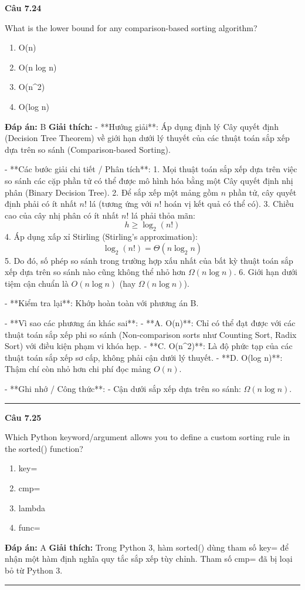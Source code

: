 \documentclass[11pt,a4paper]{article}
\newenvironment{question}[1]{%
  \par\vspace{1em}\noindent\textbf{\large Câu #1}\par\vspace{0.4em}
}{%
  \par\vspace{1em}\hrule\vspace{0.6em}
}
\newenvironment{choices}{%
  \begin{enumerate}[label=\textbf{\Alph*.},leftmargin=2.2em,itemsep=2pt,topsep=3pt]
}{%
  \end{enumerate}
}
\newcommand{\choice}{\item}
\begin{document}
\begin{question}{7.24}
What is the lower bound for any comparison-based sorting algorithm?
\begin{choices}
\choice O(n)
\choice O(n log n)
\choice O(n^2)
\choice O(log n)
\end{choices}
\textbf{Đáp án:} B
\textbf{Giải thích:} - **Hướng giải**:
  Áp dụng định lý Cây quyết định (Decision Tree Theorem) về giới hạn dưới lý thuyết của các thuật toán sắp xếp dựa trên so sánh (Comparison-based Sorting).

- **Các bước giải chi tiết / Phân tích**:
  1. Mọi thuật toán sắp xếp dựa trên việc so sánh các cặp phần tử có thể được mô hình hóa bằng một Cây quyết định nhị phân (Binary Decision Tree).
  2. Để sắp xếp một mảng gồm \(n\) phần tử, cây quyết định phải có ít nhất \(n!\) lá (tương ứng với \(n!\) hoán vị kết quả có thể có).
  3. Chiều cao của cây nhị phân có ít nhất \(n!\) lá phải thỏa mãn:
     \[ h \ge \log_2(n!) \]
  4. Áp dụng xấp xỉ Stirling (Stirling's approximation):
     \[ \log_2(n!) = \Theta(n \log_2 n) \]
  5. Do đó, số phép so sánh trong trường hợp xấu nhất của bất kỳ thuật toán sắp xếp dựa trên so sánh nào cũng không thể nhỏ hơn \(\Omega(n \log n)\).
  6. Giới hạn dưới tiệm cận chuẩn là \(O(n \log n)\) (hay \(\Omega(n \log n)\)).

- **Kiểm tra lại**:
  Khớp hoàn toàn với phương án B.

- **Vì sao các phương án khác sai**:
  - **A. O(n)**: Chỉ có thể đạt được với các thuật toán sắp xếp phi so sánh (Non-comparison sorts như Counting Sort, Radix Sort) với điều kiện phạm vi khóa hẹp.
  - **C. O(n^2)**: Là độ phức tạp của các thuật toán sắp xếp sơ cấp, không phải cận dưới lý thuyết.
  - **D. O(log n)**: Thậm chí còn nhỏ hơn chi phí đọc mảng \(O(n)\).

- **Ghi nhớ / Công thức**:
  - Cận dưới sắp xếp dựa trên so sánh: \(\Omega(n \log n)\).
\end{question}

\begin{question}{7.25}
Which Python keyword/argument allows you to define a custom sorting rule in the sorted() function?
\begin{choices}
\choice key=
\choice cmp=
\choice lambda
\choice func=
\end{choices}
\textbf{Đáp án:} A
\textbf{Giải thích:} Trong Python 3, hàm sorted() dùng tham số key= để nhận một hàm định nghĩa quy tắc sắp xếp tùy chỉnh. Tham số cmp= đã bị loại bỏ từ Python 3.
\end{question}
\end{document}
